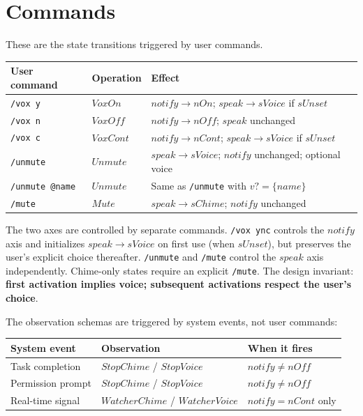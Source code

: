 \documentclass[a4paper,10pt,fleqn]{article}
\begin{document}
\section{Commands}

These are the state transitions triggered by user commands.

\begin{center}
\begin{tabular}{l|l|l}
\textbf{User command} & \textbf{Operation} & \textbf{Effect} \\
\hline
\texttt{/vox y}          & $VoxOn$   & $notify \to nOn$; $speak \to sVoice$ if $sUnset$ \\
\texttt{/vox n}          & $VoxOff$  & $notify \to nOff$; $speak$ unchanged \\
\texttt{/vox c}          & $VoxCont$ & $notify \to nCont$; $speak \to sVoice$ if $sUnset$ \\
\texttt{/unmute}         & $Unmute$  & $speak \to sVoice$; $notify$ unchanged; optional voice \\
\texttt{/unmute @name}   & $Unmute$  & Same as \texttt{/unmute} with $v? = \{name\}$ \\
\texttt{/mute}           & $Mute$    & $speak \to sChime$; $notify$ unchanged \\
\end{tabular}
\end{center}

The two axes are controlled by separate commands.
\texttt{/vox y\textbar n\textbar c} controls the $notify$ axis
and initializes $speak \to sVoice$ on first use (when $sUnset$),
but preserves the user's explicit choice thereafter.
\texttt{/unmute} and \texttt{/mute} control the $speak$ axis
independently. Chime-only states require an explicit
\texttt{/mute}. The design invariant: \textbf{first activation
implies voice; subsequent activations respect the user's choice}.

The observation schemas are triggered by system events, not
user commands:

\begin{center}
\begin{tabular}{l|l|l}
\textbf{System event} & \textbf{Observation} & \textbf{When it fires} \\
\hline
Task completion      & $StopChime$ / $StopVoice$       & $notify \neq nOff$ \\
Permission prompt    & $StopChime$ / $StopVoice$       & $notify \neq nOff$ \\
Real-time signal     & $WatcherChime$ / $WatcherVoice$ & $notify = nCont$ only \\
\end{tabular}
\end{center}
\end{document}
